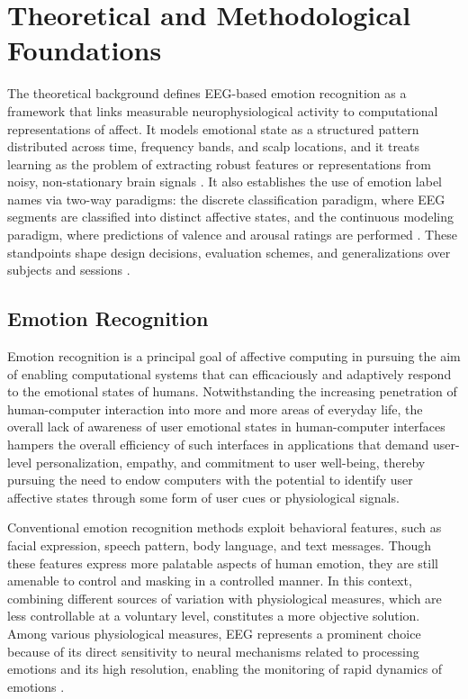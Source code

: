 \documentclass{WileyMSP-template}
\begin{document}
\section{Theoretical and Methodological Foundations}
The theoretical background defines EEG-based emotion recognition as a framework that links measurable neurophysiological activity to computational representations of affect. It models emotional state as a structured pattern distributed across time, frequency bands, and scalp locations, and it treats learning as the problem of extracting robust features or representations from noisy, non-stationary brain signals \cite{wang2024researchprogress}. It also establishes the use of emotion label names via two-way paradigms: the discrete classification paradigm, where EEG segments are classified into distinct affective states, and the continuous modeling paradigm, where predictions of valence and arousal ratings are performed \cite{ma2024peerjreview}. These standpoints shape design decisions, evaluation schemes, and generalizations over subjects and sessions \cite{li2022transferreview}.

\subsection{Emotion Recognition}
Emotion recognition is a principal goal of affective computing in pursuing the aim of enabling computational systems that can efficaciously and adaptively respond to the emotional states of humans. Notwithstanding the increasing penetration of human-computer interaction into more and more areas of everyday life, the overall lack of awareness of user emotional states in human-computer interfaces hampers the overall efficiency of such interfaces in applications that demand user-level personalization, empathy, and commitment to user well-being, thereby pursuing the need to endow computers with the potential to identify user affective states through some form of user cues or physiological signals.

Conventional emotion recognition methods exploit behavioral features, such as facial expression, speech pattern, body language, and text messages. Though these features express more palatable aspects of human emotion, they are still amenable to control and masking in a controlled manner. In this context, combining different sources of variation with physiological measures, which are less controllable at a voluntary level, constitutes a more objective solution. Among various physiological measures, EEG represents a prominent choice because of its direct sensitivity to neural mechanisms related to processing emotions and its high resolution, enabling the monitoring of rapid dynamics of emotions \cite{ma2024peerjreview,hamzah2024heliyon}.
\end{document}
